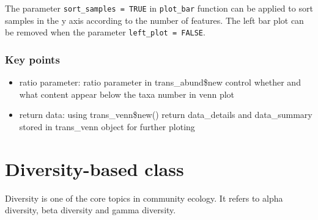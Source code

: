 \documentclass[
]{book}
\newenvironment{Shaded}{\begin{snugshade}}{\end{snugshade}}
\newcommand{\AttributeTok}[1]{\textcolor[rgb]{0.77,0.63,0.00}{#1}}
\newcommand{\CommentTok}[1]{\textcolor[rgb]{0.56,0.35,0.01}{\textit{#1}}}
\newcommand{\ConstantTok}[1]{\textcolor[rgb]{0.00,0.00,0.00}{#1}}
\newcommand{\FunctionTok}[1]{\textcolor[rgb]{0.00,0.00,0.00}{#1}}
\newcommand{\NormalTok}[1]{#1}
\newcommand{\OtherTok}[1]{\textcolor[rgb]{0.56,0.35,0.01}{#1}}
\newcommand{\SpecialCharTok}[1]{\textcolor[rgb]{0.00,0.00,0.00}{#1}}
\newcommand{\StringTok}[1]{\textcolor[rgb]{0.31,0.60,0.02}{#1}}
\providecommand{\tightlist}{%
  \setlength{\itemsep}{0pt}\setlength{\parskip}{0pt}}
\begin{document}
The parameter \texttt{sort\_samples\ =\ TRUE} in \texttt{plot\_bar} function can be applied to sort samples in the y axis according to the number of features.
The left bar plot can be removed when the parameter \texttt{left\_plot\ =\ FALSE}.

\begin{Shaded}
\end{Shaded}

\hypertarget{key-points-2}{%
\subsection{Key points}\label{key-points-2}}

\begin{itemize}
\tightlist
\item
  ratio parameter: ratio parameter in trans\_abund\$new control whether and what content appear below the taxa number in venn plot
\item
  return data: using trans\_venn\$new() return data\_details and data\_summary stored in trans\_venn object for further ploting
\end{itemize}

\hypertarget{diversity-based-class}{%
\chapter{Diversity-based class}\label{diversity-based-class}}

Diversity is one of the core topics in community ecology.
It refers to alpha diversity, beta diversity and gamma diversity.
\end{document}
